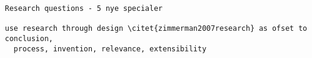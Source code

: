 
\begin{verbatim}
Research questions - 5 nye specialer

use research through design \citet{zimmerman2007research} as ofset to conclusion,
  process, invention, relevance, extensibility 

\end{verbatim}



